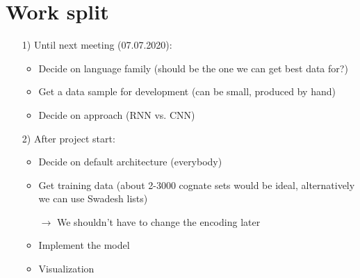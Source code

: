 \documentclass[a4paper, 10pt]{article}
\begin{document}
\newpage
\section{Work split}
\begin{itemize}
    \item[1)] Until next meeting (07.07.2020):
    \begin{itemize}
        \item Decide on language family (should be the one we can get best data for?)
        \item Get a data sample for development (can be small, produced by hand)
        \item Decide on approach (RNN vs. CNN)
    \end{itemize} 
    \item[2)] After project start:
    \begin{itemize}
        \item Decide on default architecture (everybody)
        \item Get training data (about 2-3000 cognate sets would be ideal, alternatively we can use Swadesh lists)
        \item[] $\rightarrow$ We shouldn't have to change the encoding later
        \item Implement the model
        \item Visualization 
    \end{itemize}
\end{itemize}

\newpage

\end{document}
